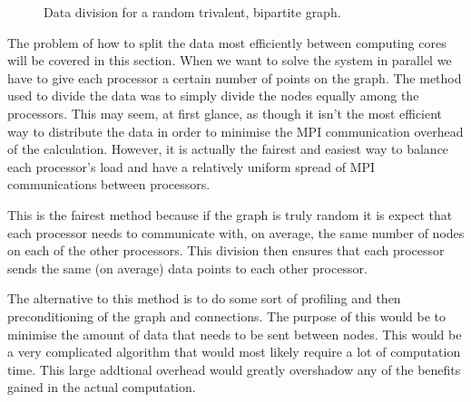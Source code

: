 \documentclass[pdftex,12pt,a4paper]{article}
\begin{document}
\begin{figure}
\begin{center}
\caption{Data division for a random trivalent, bipartite graph.}
\end{center}
\end{figure}


The problem of how to split the data most efficiently between computing cores will be covered in this section. When we want to solve the system in parallel we have to give each processor a certain number of points on the graph. The method used to divide the data was to simply divide the nodes equally among the processors. This may seem, at first glance, as though it isn't the most efficient way to distribute the data in order to minimise the MPI communication overhead of the calculation. However, it is actually the fairest and easiest way to balance each processor's load and have a relatively uniform spread of MPI communications between processors.

This is the fairest method because if the graph is truly random it is expect that each processor needs to communicate with, on average, the same number of nodes on each of the other processors. This division then ensures that each processor sends the same (on average) data points to each other processor.

The alternative to this method is to do some sort of profiling and then preconditioning of the graph and connections. The purpose of this would be to minimise the amount of data that needs to be sent between nodes. This would be a very complicated algorithm that would most likely require a lot of computation time. This large addtional overhead would greatly overshadow any of the benefits gained in the actual computation.


\end{document}
